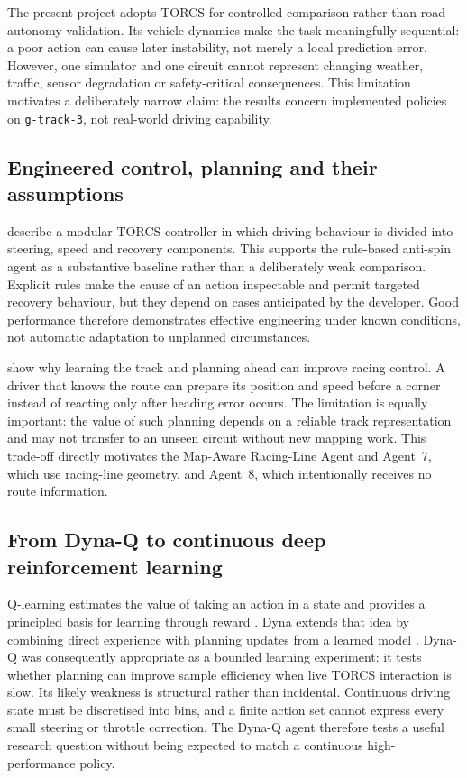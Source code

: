 The present project adopts TORCS for controlled comparison rather than road-autonomy validation. Its vehicle dynamics make the task meaningfully sequential: a poor action can cause later instability, not merely a local prediction error. However, one simulator and one circuit cannot represent changing weather, traffic, sensor degradation or safety-critical consequences. This limitation motivates a deliberately narrow claim: the results concern implemented policies on \texttt{g-track-3}, not real-world driving capability.

\subsection{Engineered control, planning and their assumptions}

\textcite{onieva2009} describe a modular TORCS controller in which driving behaviour is divided into steering, speed and recovery components. This supports the rule-based anti-spin agent as a substantive baseline rather than a deliberately weak comparison. Explicit rules make the cause of an action inspectable and permit targeted recovery behaviour, but they depend on cases anticipated by the developer. Good performance therefore demonstrates effective engineering under known conditions, not automatic adaptation to unplanned circumstances.

\textcite{quadflieg2010} show why learning the track and planning ahead can improve racing control. A driver that knows the route can prepare its position and speed before a corner instead of reacting only after heading error occurs. The limitation is equally important: the value of such planning depends on a reliable track representation and may not transfer to an unseen circuit without new mapping work. This trade-off directly motivates the Map-Aware Racing-Line Agent and Agent~7, which use racing-line geometry, and Agent~8, which intentionally receives no route information.

\subsection{From Dyna-Q to continuous deep reinforcement learning}

Q-learning estimates the value of taking an action in a state and provides a principled basis for learning through reward \parencite{watkinsdayan1992}. Dyna extends that idea by combining direct experience with planning updates from a learned model \parencite{sutton1990}. Dyna-Q was consequently appropriate as a bounded learning experiment: it tests whether planning can improve sample efficiency when live TORCS interaction is slow. Its likely weakness is structural rather than incidental. Continuous driving state must be discretised into bins, and a finite action set cannot express every small steering or throttle correction. The Dyna-Q agent therefore tests a useful research question without being expected to match a continuous high-performance policy.

